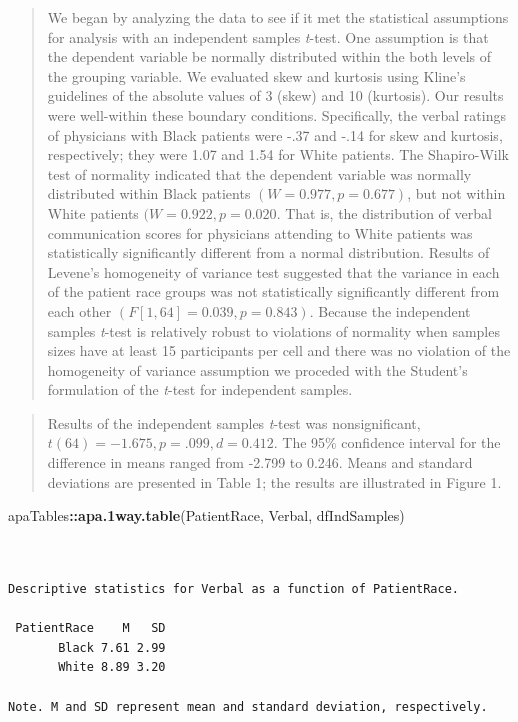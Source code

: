 \documentclass[
  11pt,
]{book}
\newenvironment{Shaded}{\begin{snugshade}}{\end{snugshade}}
\newcommand{\FunctionTok}[1]{\textcolor[rgb]{0.27,0.27,0.27}{\textbf{#1}}}
\newcommand{\NormalTok}[1]{#1}
\newcommand{\SpecialCharTok}[1]{\textcolor[rgb]{0.43,0.43,0.43}{\textbf{#1}}}
\begin{document}
\begin{quote}
We began by analyzing the data to see if it met the statistical assumptions for analysis with an independent samples \emph{t}-test. One assumption is that the dependent variable be normally distributed within the both levels of the grouping variable. We evaluated skew and kurtosis using Kline's \citeyearpar{kline_data_2016} guidelines of the absolute values of 3 (skew) and 10 (kurtosis). Our results were well-within these boundary conditions. Specifically, the verbal ratings of physicians with Black patients were -.37 and -.14 for skew and kurtosis, respectively; they were 1.07 and 1.54 for White patients. The Shapiro-Wilk test of normality indicated that the dependent variable was normally distributed within Black patients \((W = 0.977, p = 0.677)\), but not within White patients \((W = 0.922, p = 0.020\). That is, the distribution of verbal communication scores for physicians attending to White patients was statistically significantly different from a normal distribution. Results of Levene's homogeneity of variance test suggested that the variance in each of the patient race groups was not statistically significantly different from each other \((F[1, 64] = 0.039, p = 0.843)\). Because the independent samples \emph{t}-test is relatively robust to violations of normality when samples sizes have at least 15 participants per cell \citep{green_using_2017} and there was no violation of the homogeneity of variance assumption we proceded with the Student's formulation of the \emph{t}-test for independent samples.
\end{quote}

\begin{quote}
Results of the independent samples \emph{t}-test was nonsignificant, \(t(64) = -1.675, p = .099, d = 0.412\). The 95\% confidence interval for the difference in means ranged from -2.799 to 0.246. Means and standard deviations are presented in Table 1; the results are illustrated in Figure 1.
\end{quote}

\begin{Shaded}
\begin{Highlighting}[]
\NormalTok{apaTables}\SpecialCharTok{::}\FunctionTok{apa.1way.table}\NormalTok{(PatientRace, Verbal, dfIndSamples)}
\end{Highlighting}
\end{Shaded}

\begin{verbatim}


Descriptive statistics for Verbal as a function of PatientRace.  

 PatientRace    M   SD
       Black 7.61 2.99
       White 8.89 3.20

Note. M and SD represent mean and standard deviation, respectively.
 
\end{verbatim}
\end{document}
